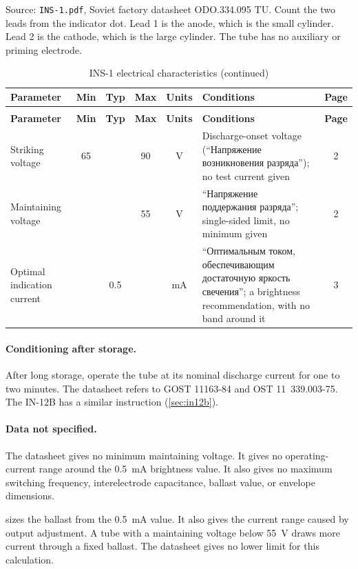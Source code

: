 Source: \texttt{INS-1.pdf}, Soviet factory datasheet ODO.334.095 TU. Count the
two leads from the indicator dot. Lead 1 is the anode, which is the small
cylinder. Lead 2 is the cathode, which is the large cylinder. The tube has no
auxiliary or priming electrode.

{\footnotesize
\begin{longtable}{|L{4.6cm}|c|c|c|c|L{3.6cm}|c|}
\caption{INS-1 electrical characteristics}\label{tab:ins1}\\
\hline
\textbf{Parameter} & \textbf{Min} & \textbf{Typ} & \textbf{Max} & \textbf{Units} & \textbf{Conditions} & \textbf{Page} \\
\hline
\endfirsthead
\caption[]{INS-1 electrical characteristics (continued)}\\
\hline
\textbf{Parameter} & \textbf{Min} & \textbf{Typ} & \textbf{Max} & \textbf{Units} & \textbf{Conditions} & \textbf{Page} \\
\hline
\endhead
Striking voltage & \num{65} & & \num{90} & \si{\volt} & Discharge-onset voltage (``Напряжение возникновения разряда''); no test current given & 2 \\
\hline
Maintaining voltage & & & \num{55} & \si{\volt} & ``Напряжение поддержания разряда''; single-sided limit, no minimum given & 2 \\
\hline
Optimal indication current & & \num{0.5} & & \si{\milli\ampere} & ``Оптимальным током, обеспечивающим достаточную яркость свечения''; a brightness recommendation, with no band around it & 3 \\
\hline
\end{longtable}
}

\paragraph{Conditioning after storage.} After long storage, operate the tube at
its nominal discharge current for one to two minutes. The datasheet refers to
GOST 11163-84 and OST 11~339.003-75. The IN-12B has a similar instruction
(\cref{sec:in12b}).

\paragraph{Data not specified.} The datasheet gives no minimum maintaining
voltage. It gives no operating-current range around the
\SI{0.5}{\milli\ampere} brightness value. It also gives no maximum switching
frequency, interelectrode capacitance, ballast value, or envelope dimensions.

 sizes the ballast from the
\SI{0.5}{\milli\ampere} value. It also gives the current range caused by output
adjustment. A tube with a maintaining voltage below \SI{55}{\volt} draws more
current through a fixed ballast. The datasheet gives no lower limit for this
calculation.

